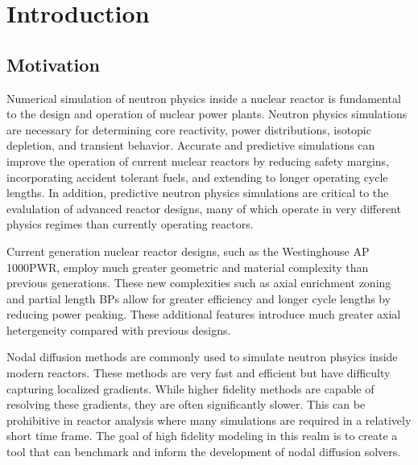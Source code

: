 \chapter{Introduction}
\label{chap:intro}

\section{Motivation}
\label{sec:chap1-motivation}


Numerical simulation of neutron physics inside a nuclear reactor is fundamental to the design and operation of nuclear power plants. Neutron physics simulations are necessary for determining core reactivity, power distributions, isotopic depletion, and transient behavior. Accurate and predictive simulations can improve the operation of current nuclear reactors by reducing safety margins, incorporating accident tolerant fuels, and extending to longer operating cycle lengths. In addition, predictive neutron physics simulations are critical to the evalulation of advanced reactor designs, many of which operate in very different physics regimes than currently operating reactors. 

Current generation nuclear reactor designs, such as the Westinghouse AP 1000\texttrademark \ac{PWR}, employ much greater geometric and material complexity than previous generations. These new complexities such as axial enrichment zoning and partial length \ac{BP}s allow for greater efficiency and longer cycle lengths by reducing power peaking. These additional features introduce much greater axial hetergeneity compared with previous designs.

Nodal diffusion methods are commonly used to simulate neutron phsyics inside modern reactors. These methods are very fast and efficient but have difficulty capturing localized gradients. While higher fidelity methods are capable of resolving these gradients, they are often significantly slower. This can be prohibitive in reactor analysis where many simulations are required in a relatively short time frame. The goal of high fidelity modeling in this realm is to create a tool that can benchmark and inform the development of nodal diffusion solvers. 

